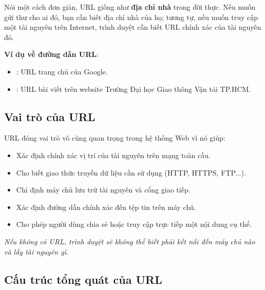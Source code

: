 \begin{tipBox}
Nói một cách đơn giản, URL giống như \textbf{địa chỉ nhà} trong đời thực. Nếu muốn gửi thư cho ai đó, bạn cần biết địa chỉ nhà của họ; tương tự, nếu muốn truy cập một tài nguyên trên Internet, trình duyệt cần biết URL chính xác của tài nguyên đó.
\end{tipBox}

\textbf{Ví dụ về đường dẫn URL}:
\begin{itemize}[leftmargin=1.8em, itemsep=2pt, parsep=0pt]
    \item {}: URL trang chủ của Google.
    \item {}: URL bài viết trên website Trường Đại học Giao thông Vận tải TP.HCM.
\end{itemize}

\subsection{Vai trò của URL}

URL đóng vai trò vô cùng quan trọng trong hệ thống Web vì nó giúp:
\begin{itemize}[leftmargin=1.8em, itemsep=2pt, parsep=0pt]
    \item Xác định chính xác vị trí của tài nguyên trên mạng toàn cầu.
    \item Cho biết giao thức truyền dữ liệu cần sử dụng (HTTP, HTTPS, FTP...).
    \item Chỉ định máy chủ lưu trữ tài nguyên và cổng giao tiếp.
    \item Xác định đường dẫn chính xác đến tệp tin trên máy chủ.
    \item Cho phép người dùng chia sẻ hoặc truy cập trực tiếp một nội dung cụ thể.
\end{itemize}
\textit{Nếu không có URL, trình duyệt sẽ không thể biết phải kết nối đến máy chủ nào và lấy tài nguyên gì.}

\subsection{Cấu trúc tổng quát của URL}

